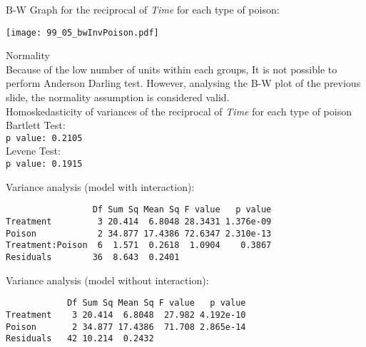 \begin{frame}
  B-W Graph for the reciprocal of \textit{Time} for each type of poison:\\
  \vspace{-0.5cm}
  \begin{center}
    \texttt{[image: 99\_05\_bwInvPoison.pdf]}
  \end{center}
\end{frame}

\begin{frame}
  Normality\\
  \vspace*{0.25cm}
  Because of the low number of units within each groups, It is not possible to perform Anderson Darling test. However, analysing the B-W plot of the previous slide, the normality assumption is considered valid. \\
  \vspace{1cm}
  Homoskedasticity of variances of the reciprocal of \textit{Time} for each type of poison\\
  \vspace*{0.25cm}
  Bartlett Test:\\
  \texttt{p value: 0.2105}\\
  \vspace*{0.75cm}
  Levene Test:\\
  \texttt{p value: 0.1915}\\
\end{frame}

\begin{frame}[fragile]
  \vspace{0.25cm}
  Variance analysis (model with interaction):
  \begin{verbatim}  
                 Df Sum Sq Mean Sq F value   p value   
Treatment         3 20.414  6.8048 28.3431 1.376e-09
Poison            2 34.877 17.4386 72.6347 2.310e-13
Treatment:Poison  6  1.571  0.2618  1.0904    0.3867    
Residuals        36  8.643  0.2401      
  \end{verbatim}
  \vspace{0.25cm}
  Variance analysis (model without interaction):
  \begin{verbatim}  
            Df Sum Sq Mean Sq F value   p value    
Treatment    3 20.414  6.8048  27.982 4.192e-10
Poison       2 34.877 17.4386  71.708 2.865e-14
Residuals   42 10.214  0.2432      
  \end{verbatim}
\end{frame}

